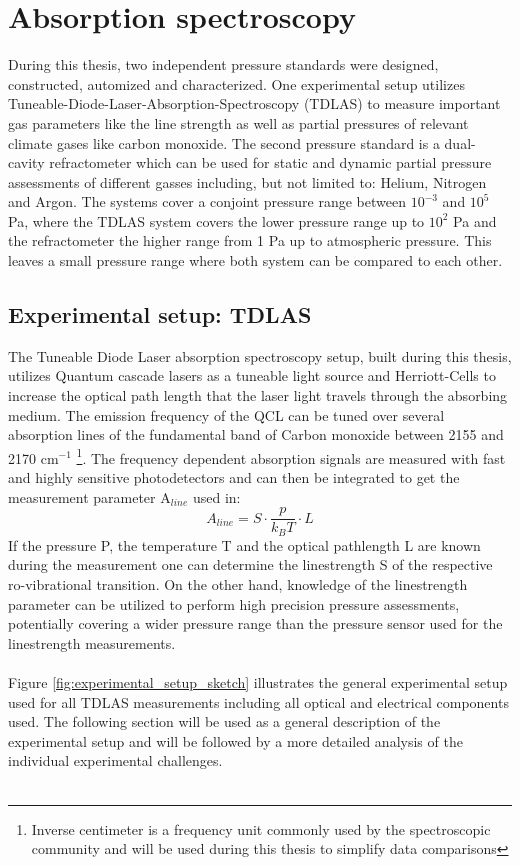 \chapter{Absorption spectroscopy}
During this thesis, two independent pressure standards were designed, constructed, automized and characterized. One experimental setup utilizes Tuneable-Diode-Laser-Absorption-Spectroscopy (TDLAS) to measure important gas parameters like the line strength as well as partial pressures of relevant climate gases like carbon monoxide. The second pressure standard is a dual-cavity refractometer which can be used for static and dynamic partial pressure assessments of different gasses including, but not limited to: Helium, Nitrogen and Argon. The systems cover a conjoint pressure range between $10^{-3}$ and  $10^{5}$ Pa, where the TDLAS system covers the lower pressure range up to  $10^{2}$ Pa and the refractometer the higher range from 1 Pa up to atmospheric pressure. This leaves a small pressure range where both system can be compared to each other.
\section*{Experimental setup: TDLAS}
The Tuneable Diode Laser absorption spectroscopy setup, built during this thesis, utilizes Quantum cascade lasers as a tuneable light source and Herriott-Cells to increase the optical path length that the laser light travels through the absorbing medium. The emission frequency of the QCL can be tuned over several absorption lines of the fundamental band of Carbon monoxide between 2155 and 2170 cm$^{-1}$ \footnote{Inverse centimeter is a frequency unit commonly used by the spectroscopic community and will be used during this thesis to simplify data comparisons}. The frequency dependent absorption signals are measured with fast and highly sensitive photodetectors and can then be integrated to get the measurement parameter  A$_{line}$ used in:
\begin{equation}
	A_{line} = S \cdot \frac{p}{k_B T} \cdot L
\end{equation}
If the pressure P, the temperature T and the optical pathlength L are known during the measurement one can determine the linestrength S of the respective ro-vibrational transition. On the other hand, knowledge of the linestrength parameter can be utilized to perform high precision pressure assessments, potentially covering a wider pressure range than the pressure sensor used for the linestrength measurements. \\\\
Figure \ref{fig:experimental_setup_sketch} illustrates the general experimental setup used for all TDLAS measurements including all optical and electrical components used. The following section will be used as a general description of the experimental setup and will be followed by a more detailed analysis of the individual experimental challenges. \\\\

